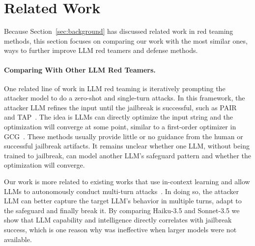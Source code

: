 \section{Related Work}\label{sec:related-work}

Because Section~\ref{sec:background} has discussed related work in red teaming methods, this section focuses on comparing our work with the most similar ones, ways to further improve LLM red teamers and defense methods.

\paragraph{Comparing With Other LLM Red Teamers.} One related line of work in LLM red teaming is iteratively prompting the attacker model to do a zero-shot and single-turn attacks. In this framework, the attacker LLM refines the input until the jailbreak is successful, such as PAIR~\citep{chao2023jailbreaking} and TAP~\citep{mehrotra2023treeOfAttacks}. The idea is LLMs can directly optimize the input string and the optimization will converge at some point, similar to a first-order optimizer in GCG~\citep{zou2023universal}. These methods usually provide little or no guidance from the human or successful jailbreak artifacts. It remains unclear whether one LLM, without being trained to jailbreak, can model another LLM's safeguard pattern and whether the optimization will converge. 


Our work is more related to existing works that use in-context learning and allow LLMs to autonomously conduct multi-turn attacks~\citep{perez-etal-2022-red, ren2024derailyourselfmultiturnllm, pavlova2024automatedredteaminggoat}. In doing so, the attacker LLM can better capture the target LLM's behavior in multiple turns, adapt to the safeguard and finally break it. By comparing Haiku-3.5 and Sonnet-3.5 we show that LLM capability and intelligence directly correlates with jailbreak success, which is one reason why \citet{perez-etal-2022-red} was ineffective when larger models were not available.  

